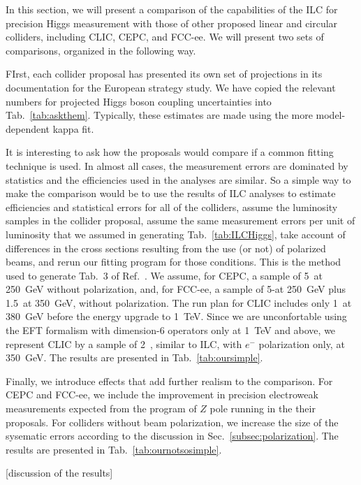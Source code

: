 

In this section, we will present a comparison of the capabilities of the ILC for precision Higgs measurement with those of other proposed linear and circular colliders, including CLIC, CEPC, and FCC-ee.  We will present two sets of comparisons, organized in the following way.

FIrst, each collider proposal has presented its own set of projections in its documentation for the European strategy study.   We have copied the relevant numbers for projected Higgs boson coupling uncertainties into Tab.~\ref{tab:askthem}.  Typically, these estimates are made using the more model-dependent kappa fit.

It is interesting to ask how the proposals would compare if a common fitting technique is used. In almost all cases, the measurement errors are dominated by statistics and the efficiencies used in the analyses are similar.  So a simple way to make the comparison would be to use the results of ILC analyses to estimate efficiencies and statistical errors for all of the colliders, assume the luminosity samples in the collider proposal, assume the same measurement errors per unit of luminosity that we assumed in generating Tab.~\ref{tab:ILCHiggs},  take account of differences in the cross sections resulting from the use (or not) of polarized beams, and rerun our fitting  program for those conditions.   This is the method used to generate Tab.~3 of Ref.~\cite{Barklow:2017suo}.   We assume, for CEPC, a sample of  5~\iab at 250~GeV without polarization, and, for FCC-ee, a sample of 5-\iab at 250~GeV plus 1.5~\iab at 350~GeV,
without polarization.  The run plan for CLIC includes only 1~\iab at 380~GeV before the energy upgrade to 1~TeV.  Since we are unconfortable using the EFT formalism with dimension-6 operators only at 1~TeV and above, we represent CLIC by a sample of
2~\iab, similar to ILC, with $e^-$ polarization only, at 350~GeV.  The results are presented in Tab.~\ref{tab:oursimple}. 

Finally, we introduce effects that add further realism to the comparison.  For CEPC and FCC-ee, we include the improvement in precision electroweak measurements expected from the program of $Z$ pole running in the their proposals.  For colliders without beam polarization, we increase the size of the sysematic errors according to the discussion in  Sec.~\ref{subsec:polarization}. The results are presented in 
Tab.~\ref{tab:ournotsosimple}. 


[discussion of the results]